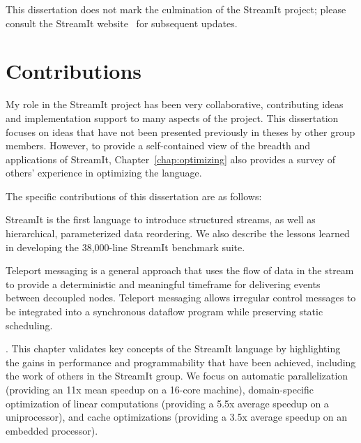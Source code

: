 This dissertation does not mark the culmination of the StreamIt
project; please consult the StreamIt website~\cite{streamitweb} for
subsequent updates.

\section{Contributions}

My role in the StreamIt project has been very collaborative,
contributing ideas and implementation support to many aspects of the
project.  This dissertation focuses on ideas that have not been
presented previously in theses by other group members.  However, to
provide a self-contained view of the breadth and applications of
StreamIt, Chapter~\ref{chap:optimizing} also provides a survey of
others' experience in optimizing the language.

The specific contributions of this dissertation are as follows:

\mybegin

  StreamIt is the first language to introduce
  structured streams, as well as hierarchical, parameterized data
  reordering.  We also describe the lessons learned in developing the
  38,000-line StreamIt benchmark suite.

  Teleport messaging is a general approach that uses
  the flow of data in the stream to provide a deterministic and
  meaningful timeframe for delivering events between decoupled nodes.
  Teleport messaging allows irregular control messages to be
  integrated into a synchronous dataflow program while preserving
  static scheduling.

.  This chapter validates key concepts of the StreamIt
  language by highlighting the gains in performance and
  programmability that have been achieved, including the work of
  others in the StreamIt group.  We focus on automatic parallelization
  (providing an 11x mean speedup on a 16-core machine),
  domain-specific optimization of linear computations (providing a
  5.5x average speedup on a uniprocessor), and cache optimizations
  (providing a 3.5x average speedup on an embedded processor).

